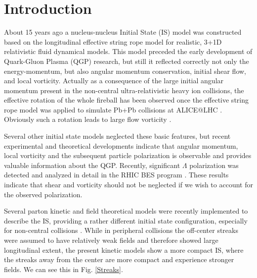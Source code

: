 \documentclass[aps,prc,twocolumn,floatfix,showpacs,a4paper,
nofootinbib,amsmath,amssymb]{revtex4-1}
\begin{document}
\section{Introduction}

About 15 years ago a nucleus-nucleus Initial State (IS) model was constructed  \cite{M2001,M2002}  based on the longitudinal effective string rope model for realistic, 3+1D relativistic fluid dynamical models. This model  preceded the early development of Quark-Gluon Plasma (QGP) research, but still it reflected correctly not only the energy-momentum, but also angular momentum conservation, initial shear flow, and local vorticity. Actually as a consequence of the large initial angular momentum present in the non-central ultra-relativistic heavy ion collisions, the effective rotation of the whole fireball has been observed once the effective string rope model was applied to simulate Pb+Pb collisions at ALICE@LHC \cite{CM_v1}.  Obviously such a rotation leads to large flow vorticity \cite{CMW13}.

Several other initial state models neglected these basic features, but recent experimental and theoretical developments indicate that angular momentum, local vorticity and the subsequent particle polarization is observable and provides valuable information about the QGP. Recently, significant $\Lambda$ polarization was detected and analyzed in detail in the RHIC BES program \cite{Lisa,Nature}.  These results indicate that shear and vorticity should not be neglected if we wish to account for the observed polarization.

Several parton kinetic and field theoretical models were recently implemented to describe the IS, providing a rather different initial state configuration, especially for non-central collisions \cite{Fig.1,PangEA2016,Pathia,AMPT,Deng2016,Vovchenko}.  While in  peripheral collisions \cite{M2001,M2002} the off-center streaks were assumed to have relatively weak fields and therefore showed large longitudinal extent, the present kinetic models show a more compact IS, where the streaks away from the center are more compact and experience stronger fields. We can see this in Fig. \ref{Streaks}.
\end{document}
